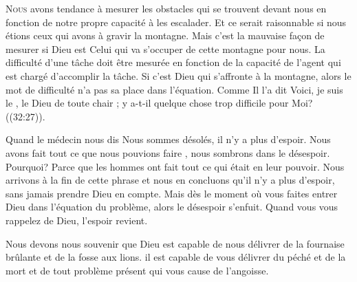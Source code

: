 




\lettrine{N}{ous} avons tendance à mesurer les obstacles
 qui se trouvent devant nous en fonction de notre propre capacité
 à les escalader. Et ce serait raisonnable si nous étions ceux qui avons
 à gravir la montagne. Mais c'est la mauvaise fa\c{c}on de mesurer
 si Dieu est Celui qui va s'occuper de cette montagne pour nous.
 La difficulté d'une tâche doit être mesurée en fonction de la capacité
 de l'agent qui est chargé d'accomplir la tâche.
 Si c'est Dieu qui s'affronte à la montagne, alors le mot
 de  \Og difficulté \Fg{}
 n'a pas sa place dans l'équation.
 Comme Il l'a dit\frcolon{} 
 \Og Voici, je suis le \Seigneur, le Dieu de toute chair ;
 y a-t-il quelque chose trop difficile pour Moi? \Fg{}
 ((32:27)). 


Quand le médecin nous dis\frcolon{} 
 \Og Nous sommes désolés, il n'y a plus d'espoir.
 Nous avons fait tout ce que nous pouvions faire \Fg{},
 nous sombrons dans le désespoir. Pourquoi?
 Parce que les hommes ont fait tout ce qui était en leur pouvoir.
 Nous arrivons à la fin de cette phrase et nous en concluons
 qu'il n'y a plus d'espoir, sans jamais prendre Dieu en compte.
 Mais dès  le moment où vous faites entrer Dieu
 dans l'équation du problème, alors le désespoir s'enfuit.
 Quand vous vous rappelez de Dieu, l'espoir revient. 

Nous devons nous souvenir que Dieu est capable de nous délivrer
 de la fournaise brûlante et de la fosse aux lions.
 il est capable de vous délivrer du péché et de la mort
 \ocadr et de tout problème présent qui vous cause de l'angoisse.

